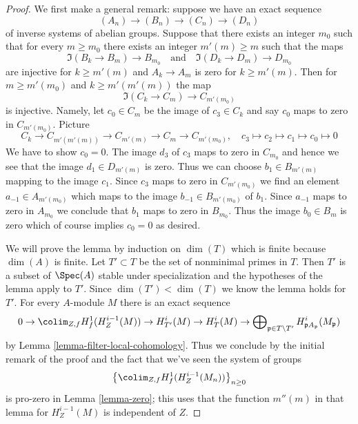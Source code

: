 \begin{proof}
We first make a general remark: suppose we have an exact
sequence
$$
(A_n) \to (B_n) \to (C_n) \to (D_n)
$$
of inverse systems of abelian groups. Suppose that there exists
an integer $m_0$ such that for every $m \geq m_0$
there exists an integer $m'(m) \geq m$ such that the maps
$$
\Im(B_k \to B_m) \longrightarrow B_{m_0}
\quad\text{and}\quad
\Im(D_k \to D_m) \longrightarrow D_{m_0}
$$
are injective for $k \geq m'(m)$ and $A_k \to A_m$ is zero
for $k \geq m'(m)$. Then for $m \geq m'(m_0)$ and $k \geq m'(m'(m))$
the map
$$
\Im(C_k \to C_m) \to C_{m'(m_0)}
$$
is injective. Namely, let $c_0 \in C_m$ be the image of $c_3 \in C_k$
and say $c_0$ maps to zero in $C_{m'(m_0)}$. Picture
$$
C_k \to C_{m'(m'(m))} \to C_{m'(m)} \to C_m \to C_{m'(m_0)},\quad
c_3 \mapsto c_2 \mapsto c_1 \mapsto c_0 \mapsto 0
$$
We have to show $c_0 = 0$.
The image $d_3$ of $c_3$ maps to zero in $C_{m_0}$ and hence
we see that the image $d_1 \in D_{m'(m)}$ is zero.
Thus we can choose $b_1 \in B_{m'(m)}$ mapping to
the image $c_1$. Since $c_3$ maps to zero in
$C_{m'(m_0)}$ we find an element $a_{-1} \in A_{m'(m_0)}$
which maps to the image $b_{-1} \in B_{m'(m_0)}$ of $b_1$.
Since $a_{-1}$ maps to zero in $A_{m_0}$ we conclude that
$b_1$ maps to zero in $B_{m_0}$. Thus the image $b_0 \in B_m$
is zero which of course implies $c_0 = 0$ as desired.

\medskip\noindent
We will prove the lemma by induction on $\dim(T)$ which is
finite because $\dim(A)$ is finite. Let $T' \subset T$ be
the set of nonminimal primes in $T$. Then $T'$ is a subset
of $\Spec(A)$ stable under specialization and the hypotheses
of the lemma apply to $T'$. Since $\dim(T') < \dim(T)$ we know
the lemma holds for $T'$. For every $A$-module $M$ there is an
exact sequence
$$
0 \to \colim_{Z, f} H^1_f(H^{i - 1}_Z(M)) \to
H^i_{T'}(M) \to H^i_T(M) \to
\bigoplus\nolimits_{\mathfrak p \in T \setminus T'}
H^i_{\mathfrak p A_\mathfrak p}(M_\mathfrak p)
$$
by Lemma \ref{lemma-filter-local-cohomology}.
Thus we conclude by the initial remark of the proof
and the fact that we've seen the system of groups
$$
\left\{\colim_{Z, f} H^1_f(H^{i - 1}_Z(M_n))\right\}_{n \geq 0}
$$
is pro-zero in Lemma \ref{lemma-zero}; this uses that the function
$m''(m)$ in that lemma for $H^{i - 1}_Z(M)$ is independent of $Z$.
\end{proof}










